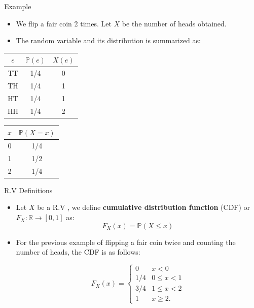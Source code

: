 \documentclass[handout]{beamer}
\begin{document}
\begin{frame}{Example}

\begin{itemize}
 \item We flip a fair coin 2 times. Let $X$ be the number of heads obtained.
 \item The random variable and its distribution is summarized as:
\end{itemize}

\begin{table}
\begin{tabular}{c c|c}
\hline
 $e$ & $\mathbb{P}(e)$ & $X(e)$   \\ 
\hline
TT & 1/4 & 0 \\
TH & 1/4 & 1 \\
HT & 1/4 & 1 \\
HH & 1/4 & 2 \\
\hline
\end{tabular}
\end{table}

\begin{table}
\begin{tabular}{c|c}
\hline
 $x$ & $\mathbb{P}(X = x)$   \\ 
\hline
0 & 1/4 \\
1 & 1/2  \\
2 & 1/4  \\
\hline
\end{tabular}
\end{table}

\end{frame}




\begin{frame}{R.V Definitions}
\scriptsize{
\begin{itemize}
 \item  Let $X$ be a R.V , we define \textbf{cumulative distribution function} (CDF) or $F_{X}: \mathbb{R} \rightarrow [0,1]$ as:
\begin{displaymath}
 F_{X}(x)=\mathbb{P}(X\leq x)
\end{displaymath}
\item For the previous example of flipping a fair coin twice and counting the number of heads, the CDF is as follows:

\[   
F_X(x) = 
     \begin{cases}
     0 & x<0 \\
     1/4 & 0 \leq x < 1 \\
     3/4 & 1 \leq x < 2 \\
     1 & x \geq 2.
     \end{cases}
\]



\end{itemize}


} 
\end{frame}
\end{document}
